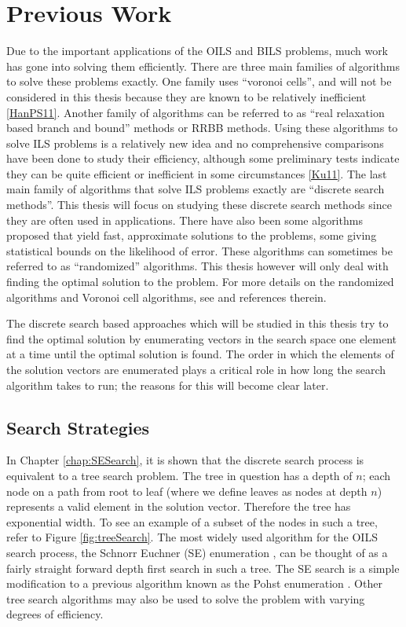 \documentclass[12pt,Bold,letterpaper]{mcgilletdclass}
\newcommand{\vsp}{\vspace{\baselineskip}}
\begin{document}
\vsp \section{Previous Work} \label{sec:prevWork}
Due to the important applications of the OILS and BILS problems, much work has
gone into solving them efficiently. There are three main families of algorithms to solve these problems exactly. One family uses ``voronoi cells'', and will not be considered in this thesis because they are known to be relatively
inefficient \ref{HanPS11}. Another family of algorithms can be referred to as ``real
relaxation based branch and bound'' methods or RRBB methods. Using these algorithms to solve ILS
problems is a relatively new idea and no comprehensive comparisons have been
done to study their efficiency, although some preliminary tests indicate they
can be quite efficient or inefficient in some circumstances \ref{Ku11}. The last main family of algorithms
that solve ILS problems exactly are ``discrete search methods''. This thesis
will focus on studying these discrete search methods since they are often used in applications. There have also been some algorithms proposed that yield fast,
approximate solutions to the problems, some giving statistical bounds on the
likelihood of error. These algorithms can sometimes be referred to as
``randomized'' algorithms. This thesis however will only deal with finding the
optimal solution to the problem. For more details on the randomized algorithms
and Voronoi cell algorithms, see \cite{HanPS11} and references therein.

The discrete search based approaches which will be studied in this thesis try to find the optimal solution by enumerating vectors in the search space one element at a time until the optimal solution is found. The order in which the elements of the solution vectors are enumerated plays a critical role in how long the search algorithm takes to run; the reasons for this will become clear later.

\vsp \subsection{Search Strategies}
In Chapter \ref{chap:SESearch}, it is shown that the discrete search process is equivalent to a tree search problem. The tree in question has a depth of $n$; each node on a path from root to leaf (where we define leaves as nodes at depth $n$) represents a valid element in the solution vector. Therefore the tree has exponential width. To see an example of a subset of the nodes in such a tree, refer to Figure \ref{fig:treeSearch}. The most widely used algorithm for the OILS search process, the Schnorr Euchner (SE) enumeration \cite{SchE94}, can be thought of as a fairly straight forward depth first search in such a tree. The SE search is a simple modification to a previous algorithm known as the Pohst enumeration \cite{Pho81}. Other tree search algorithms may also be used to solve the problem with varying degrees of efficiency.
\end{document}
